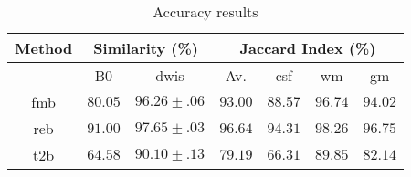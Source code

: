 
\begin{table}[h]
\caption{Accuracy results}
\label{table:results}
\begin{center}
\begin{tabular}{c||cc|cccc}
\hline
Method & \multicolumn{2}{c|}{Similarity (\%)} & \multicolumn{4}{c}{ Jaccard Index (\%)} \\
\hline
 & B0 & \glspl*{dwi} & Av. & \gls*{csf} & \gls*{wm} & \gls*{gm} \\
\hline
\gls*{fmb} & $80.05$ & $96.26\pm.06$ & $93.00$ & $88.57$ & $96.74$ & $94.02$ \\
\hline
\gls*{reb} & $91.00$ & $97.65\pm.03$ & $96.64$ & $94.31$ & $98.26$ & $96.75$ \\
\hline
\gls*{t2b} & $64.58$ & $90.10\pm.13$ & $79.19$ & $66.31$ & $89.85$ & $82.14$ \\
\hline
\end{tabular}
\end{center}
\end{table}